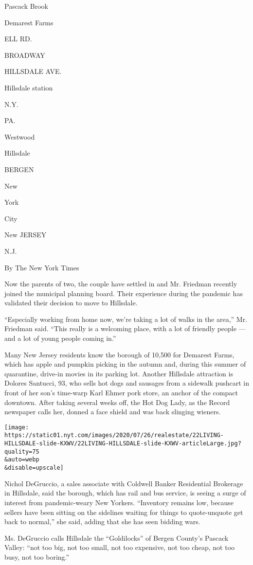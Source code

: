 Pascack Brook

Demarest Farms

ELL RD.

BROADWAY

HILLSDALE AVE.

Hillsdale station

N.Y.

PA.

Westwood

Hillsdale

BERGEN

New

York

City

New JERSEY

N.J.

By The New York Times

Now the parents of two, the couple have settled in and Mr. Friedman
recently joined the municipal planning board. Their experience during
the pandemic has validated their decision to move to Hillsdale.

``Especially working from home now, we're taking a lot of walks in the
area,'' Mr. Friedman said. ``This really is a welcoming place, with a
lot of friendly people --- and a lot of young people coming in.''

Many New Jersey residents know the borough of 10,500 for Demarest Farms,
which has apple and pumpkin picking in the autumn and, during this
summer of quarantine, drive-in movies in its parking lot. Another
Hillsdale attraction is Dolores Santucci, 93, who sells hot dogs and
sausages from a sidewalk pushcart in front of her son's time-warp Karl
Ehmer pork store, an anchor of the compact downtown. After taking
several weeks off, the Hot Dog Lady, as the Record newspaper calls her,
donned a face shield and was back slinging wieners.

\texttt{[image: https://static01.nyt.com/images/2020/07/26/realestate/22LIVING-HILLSDALE-slide-KXWV/22LIVING-HILLSDALE-slide-KXWV-articleLarge.jpg?quality=75\\\&auto=webp\\\&disable=upscale]}

Nichol DeGruccio, a sales associate with Coldwell Banker Residential
Brokerage in Hillsdale, said the borough, which has rail and bus
service, is seeing a surge of interest from pandemic-weary New Yorkers.
``Inventory remains low, because sellers have been sitting on the
sidelines waiting for things to quote-unquote get back to normal,'' she
said, adding that she has seen bidding wars.

Ms. DeGruccio calls Hillsdale the ``Goldilocks'' of Bergen County's
Pascack Valley: ``not too big, not too small, not too expensive, not too
cheap, not too busy, not too boring.''


